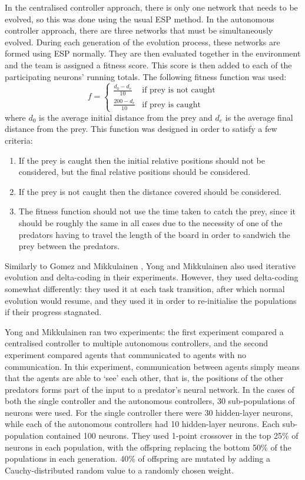 \documentclass[12pt]{article} %
\begin{document}
In the centralised controller approach, there is only one network that needs to be evolved, so this was done using the usual ESP method. In the autonomous controller approach, there are three networks that must be simultaneously evolved. During each generation of the evolution process, these networks are formed using ESP normally. They are then evaluated together in the environment and the team is assigned a fitness score. This score is then added to each of the participating neurons' running totals. The following fitness function was used:
\[
f = 
\begin{cases}
\frac{d_0-d_e}{10}& \text{if prey is not caught}\\
\frac{200-d_e}{10}& \text{if prey is caught}
\end{cases}
\]
where $d_0$ is the average initial distance from the  prey and $d_e$ is the average final distance from the prey. This function was designed in order to satisfy a few criteria:
\begin{enumerate}
	\item If the prey is caught then the initial relative positions should not be considered, but the final relative positions should be considered.
	\item If the prey is not caught then the distance covered should be considered.
	\item The fitness function should not use the time taken to catch the prey, since it should be roughly the same in all cases due to the necessity of one of the predators having to travel the length of the board in order to sandwich the prey between the predators.
\end{enumerate}
Similarly to Gomez and Mikkulainen \cite{Gomez1997}, Yong and Mikkulainen also used iterative evolution and delta-coding in their experiments. However, they used delta-coding somewhat differently: they used it at each task transition, after which normal evolution would resume, and they used it in order to re-initialise the populations if their progress stagnated.

Yong and Mikkulainen ran two experiments: the first experiment compared a centralised controller to multiple autonomous controllers, and the second experiment compared agents that communicated to agents with no communication. In this experiment, communication between agents simply means that the agents are able to `see' each other, that is, the positions of the other predators forms part of the input to a predator's neural network. In the cases of both the single controller and the autonomous controllers, 30 sub-populations of neurons were used. For the single controller there were 30 hidden-layer neurons, while each of the autonomous controllers had 10 hidden-layer neurons. Each sub-population contained 100 neurons. They used 1-point crossover in the top 25\% of neurons in each population, with the offspring replacing the bottom 50\% of the populations in each generation. 40\% of offspring are mutated by adding a Cauchy-distributed \cite{Rudolph1997} random value to a randomly chosen weight.
\end{document}
